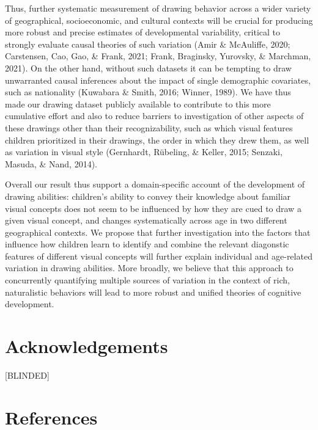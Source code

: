 \documentclass[
  man]{apa6}
\begin{document}
Thus, further systematic measurement of drawing behavior across a wider variety of geographical, socioeconomic, and cultural contexts will be crucial for producing more robust and precise estimates of developmental variability, critical to strongly evaluate causal theories of such variation (Amir \& McAuliffe, 2020; Carstensen, Cao, Gao, \& Frank, 2021; Frank, Braginsky, Yurovsky, \& Marchman, 2021). On the other hand, without such datasets it can be tempting to draw unwarranted causal inferences about the impact of single demographic covariates, such as nationality (Kuwabara \& Smith, 2016; Winner, 1989). We have thus made our drawing dataset publicly available to contribute to this more cumulative effort and also to reduce barriers to investigation of other aspects of these drawings other than their recognizability, such as which visual features children prioritized in their drawings, the order in which they drew them, as well as variation in visual style (Gernhardt, Rübeling, \& Keller, 2015; Senzaki, Masuda, \& Nand, 2014).

Overall our result thus support a domain-specific account of the development of drawing abilities: children's ability to convey their knowledge about familiar visual concepts does not seem to be influenced by how they are cued to draw a given visual concept, and changes systematically across age in two different geographical contexts. We propose that further investigation into the factors that influence how children learn to identify and combine the relevant diagonstic features of different visual concepts will further explain individual and age-related variation in drawing abilities. More broadly, we believe that this approach to concurrently quantifying multiple sources of variation in the context of rich, naturalistic behaviors will lead to more robust and unified theories of cognitive development.

\hypertarget{acknowledgements}{%
\section{Acknowledgements}\label{acknowledgements}}

{[}BLINDED{]}

\hypertarget{references}{%
\section{References}\label{references}}

\begingroup
\setlength{\parindent}{-0.5in}
\setlength{\leftskip}{0.5in}
\end{document}
